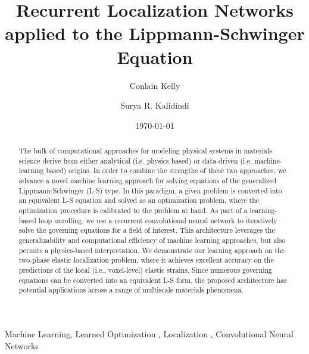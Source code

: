 \documentclass[3p, preprint]{elsarticle}
\begin{document}
\title{Recurrent Localization Networks applied to the Lippmann-Schwinger Equation}

\author{Conlain Kelly \texorpdfstring{} {} }


\author{Surya R. Kalidindi  \texorpdfstring{} {} }%


\date{\today}

\begin{abstract}
The bulk of computational approaches for modeling physical systems in materials science derive from either analytical (i.e. physics based) or data-driven (i.e. machine-learning based) origins. In order to combine the strengths of these two approaches, we advance a novel machine learning approach for solving equations of the generalized Lippmann-Schwinger (L-S) type. In this paradigm, a given problem is converted into an equivalent L-S equation and solved as an optimization problem, where the optimization procedure is calibrated to the problem at hand. As part of a learning-based loop unrolling, we use a recurrent convolutional neural network to iteratively solve the governing equations for a field of interest. This architecture leverages the generalizability and computational efficiency of machine learning approaches, but also permits a physics-based interpretation. We demonstrate our learning approach on the two-phase elastic localization problem, where it achieves excellent accuracy on the predictions of the local (i.e., voxel-level) elastic strains. Since numerous governing equations can be converted into an equivalent L-S form, the proposed architecture has potential applications across a range of multiscale materials phenomena.

\end{abstract} 

\begin{keyword}
    Machine Learning\sep%
    Learned Optimization \sep%
    Localization \sep%
    Convolutional Neural Networks
\end{keyword}

\maketitle
\end{document}
